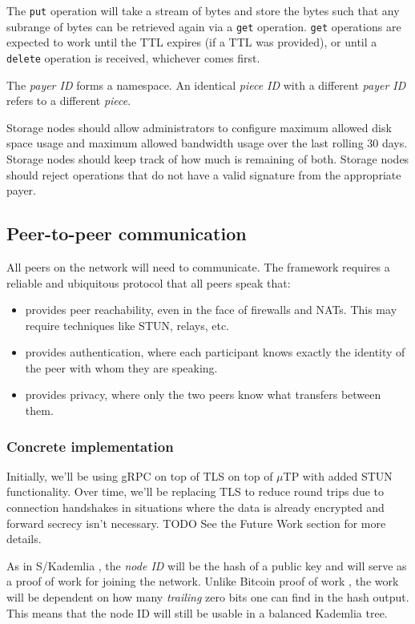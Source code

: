 \documentclass[a4paper,10pt]{article}
\newcommand{\code}[1]{{\tt #1}}
\newcommand{\todo}[1]{{\color{red} TODO #1}}
\begin{document}
The \code{put} operation will take a stream of bytes and store the bytes such
that any subrange of bytes can be retrieved again via a \code{get} operation.
\code{get} operations are expected to work until the TTL expires (if a TTL was
provided), or until a \code{delete} operation is received, whichever comes
first.

The {\em payer ID} forms a namespace. An identical {\em piece ID} with a
different {\em payer ID} refers to a different {\em piece}.

Storage nodes should allow administrators to configure maximum allowed disk
space usage and maximum allowed bandwidth usage over the last rolling 30 days.
Storage nodes should keep track of how much is remaining of both. Storage nodes should reject operations that do not have a valid signature from
the appropriate payer.

\subsection{Peer-to-peer communication}

All peers on the network will need to communicate. The framework
requires a reliable and ubiquitous protocol that all peers speak that:

\begin{itemize}
\item provides peer reachability, even in the face of firewalls and NATs. This
 may require techniques like STUN, relays, etc.
\item provides authentication, where each participant knows exactly the
 identity of the peer with whom they are speaking.
\item provides privacy, where only the two peers know what transfers between
 them.
\end{itemize}

\subsubsection{Concrete implementation}

Initially, we'll be using gRPC \cite{grpc} on top of TLS on top of
$\mu$TP \cite{utp} with added STUN functionality. Over time, we'll be
replacing TLS to reduce round trips due to connection handshakes in situations
where the data is already encrypted and forward secrecy isn't necessary.
\todo{} See the Future Work section for more details.

As in S/Kademlia \cite{skad}, the {\em node ID} will be the hash of a
public key and will serve as a proof of work for joining the network. 
Unlike Bitcoin proof of work \cite{bitcoin},
the work will be dependent on how many {\em trailing} zero bits one can find in
the hash output. This means that the node ID will still be usable in a balanced
Kademlia \cite{kad} tree.
\end{document}
